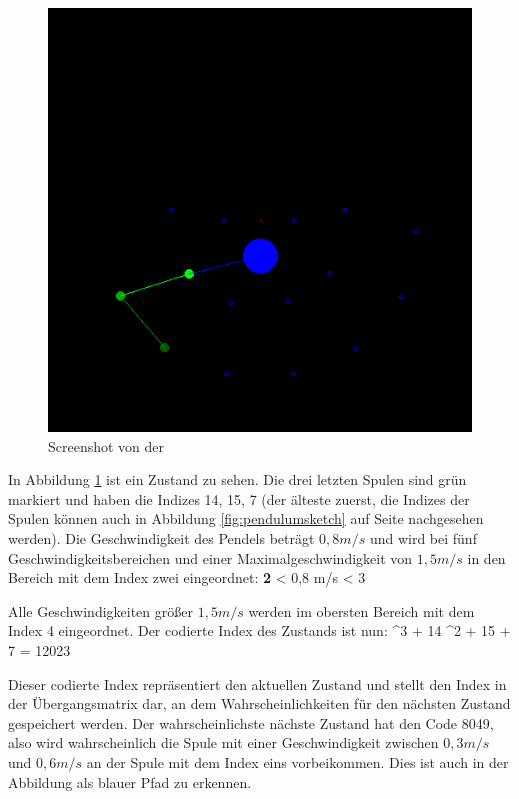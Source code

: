 \begin{figure}[hbt]
  \centering
  \includegraphics[width=\textwidth]{images/prediction.png}
  \caption{Screenshot von der }
  \label{fig:screenmarkov}
\end{figure}

In Abbildung \ref{fig:screenmarkov} ist ein Zustand zu sehen.
Die drei letzten Spulen sind grün markiert und haben die Indizes 14, 15, 7 (der älteste zuerst, die Indizes der Spulen können auch in Abbildung \ref{fig:pendulumsketch} auf Seite \pageref{fig:pendulumsketch} nachgesehen werden).
Die Geschwindigkeit des Pendels beträgt $0,8 m/s$ und wird bei fünf Geschwindigkeitsbereichen und einer Maximalgeschwindigkeit von $1,5 m/s$ in den Bereich mit dem Index zwei eingeordnet:
\mathematik
\textbf{2}\cdot{} < 0,8 m/s < 3\cdot{}
\mathematikstop

Alle Geschwindigkeiten größer $1,5 m/s$ werden im obersten Bereich mit dem Index 4 eingeordnet.
Der codierte Index des Zustands ist nun:
 ^3 + 14 ^2 + 15  + 7 = 12023
\mathematikstop

Dieser codierte Index repräsentiert den aktuellen Zustand und stellt den Index in der Übergangsmatrix dar, an dem Wahrscheinlichkeiten für den nächsten Zustand gespeichert werden.
Der wahrscheinlichste nächste Zustand hat den Code 8049, also wird wahrscheinlich die Spule mit einer Geschwindigkeit zwischen $0,3 m/s$ und $0,6 m/s$ an der Spule mit dem Index eins vorbeikommen.
Dies ist auch in der Abbildung als blauer Pfad zu erkennen.

